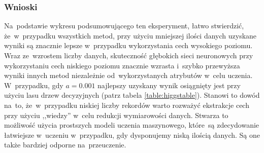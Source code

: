 \subsubsection{Wnioski}
Na~podstawie wykresu podsumowującego ten eksperyment, łatwo stwierdzić, że~w~przypadku wszystkich metod, przy użyciu mniejszej ilości danych uzyskane wyniki są znacznie lepsze w~przypadku wykorzystania cech wysokiego poziomu. Wraz ze~wzrostem liczby danych, skuteczność głębokich sieci neuronowych przy wykorzystaniu cech niskiego poziomu znacznie wzrasta i~szybko przewyższa wyniki innych metod niezależnie od~wykorzystanych atrybutów w~celu uczenia. W~przypadku, gdy $a=0.001$ najlepszy uzyskany wynik osiągnięty jest przy użyciu lasu drzew decyzyjnych (patrz tabela \ref{table:higgstable}). Stanowi to dowód na~to, że~w~przypadku niskiej liczby rekordów warto rozważyć ekstrakcje cech przy użyciu ,,wiedzy'' w~celu redukcji wymiarowości danych. Stwarza to możliwość użycia prostszych modeli uczenia maszynowego, które~są zdecydowanie łatwiejsze w~uczeniu w~przypadku, gdy dysponujemy niską ilością danych. Są one także bardziej odporne na~przeuczenie.

